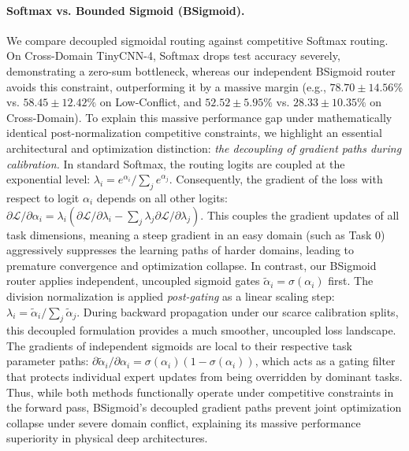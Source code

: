 \paragraph{Softmax vs. Bounded Sigmoid (BSigmoid).} We compare decoupled sigmoidal routing against competitive Softmax routing. On Cross-Domain TinyCNN-4, Softmax drops test accuracy severely, demonstrating a zero-sum bottleneck, whereas our independent BSigmoid router avoids this constraint, outperforming it by a massive margin (e.g., $78.70 \pm 14.56\%$ vs. $58.45 \pm 12.42\%$ on Low-Conflict, and $52.52 \pm 5.95\%$ vs. $28.33 \pm 10.35\%$ on Cross-Domain). 
To explain this massive performance gap under mathematically identical post-normalization competitive constraints, we highlight an essential architectural and optimization distinction: \emph{the decoupling of gradient paths during calibration.} In standard Softmax, the routing logits are coupled at the exponential level: $\lambda_i = e^{\alpha_i}/\sum_j e^{\alpha_j}$. Consequently, the gradient of the loss with respect to logit $\alpha_i$ depends on all other logits: $\partial \mathcal{L}/\partial \alpha_i = \lambda_i (\partial \mathcal{L}/\partial \lambda_i - \sum_j \lambda_j \partial \mathcal{L}/\partial \lambda_j)$. This couples the gradient updates of all task dimensions, meaning a steep gradient in an easy domain (such as Task 0) aggressively suppresses the learning paths of harder domains, leading to premature convergence and optimization collapse.
In contrast, our BSigmoid router applies independent, uncoupled sigmoid gates $\tilde{\alpha}_i = \sigma(\alpha_i)$ first. The division normalization is applied \emph{post-gating} as a linear scaling step: $\lambda_i = \tilde{\alpha}_i/\sum_j \tilde{\alpha}_j$. During backward propagation under our scarce calibration splits, this decoupled formulation provides a much smoother, uncoupled loss landscape. The gradients of independent sigmoids are local to their respective task parameter paths: $\partial \tilde{\alpha}_i/\partial \alpha_i = \sigma(\alpha_i)(1 - \sigma(\alpha_i))$, which acts as a gating filter that protects individual expert updates from being overridden by dominant tasks. Thus, while both methods functionally operate under competitive constraints in the forward pass, BSigmoid's decoupled gradient paths prevent joint optimization collapse under severe domain conflict, explaining its massive performance superiority in physical deep architectures.

